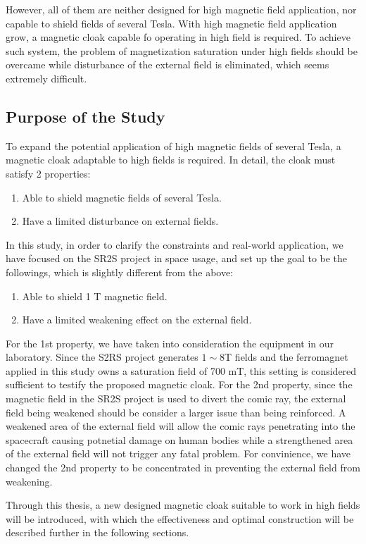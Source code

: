 However, all of them are neither designed for high magnetic field application,
nor capable to shield fields of several Tesla.
With high magnetic field application grow,
a magnetic cloak capable fo operating in high field is required.
To achieve such system, the problem of magnetization saturation under high fields should be overcame
while disturbance of the external field is eliminated,
which seems extremely difficult.


\newpage
\subsection{Purpose of the Study}
To expand the potential application of high magnetic fields of several Tesla,
a magnetic cloak adaptable to high fields is required.
In detail, the cloak must satisfy 2 properties:
\begin{enumerate}
  \item Able to shield magnetic fields of several Tesla.
  \item Have a limited disturbance on external fields.
\end{enumerate}

In this study, in order to clarify the constraints and real-world application,
we have focused on the SR2S project in space usage,
and set up the goal to be the followings, which is slightly different from the above:
\begin{enumerate}
  \item Able to shield 1 T magnetic field.
  \item Have a limited weakening effect on the external field.
\end{enumerate}
For the 1st property, we have taken into consideration the equipment in our laboratory.
Since the S2RS project generates $1\sim 8$T fields and the ferromagnet applied in this study owns a saturation field of 700 mT,
this setting is considered sufficient to testify the proposed magnetic cloak.
For the 2nd property, since the magnetic field in the SR2S project is used to divert the comic ray,
the external field being weakened should be consider a larger issue than being reinforced.
A weakened area of the external field will allow the comic rays penetrating into the spacecraft causing potnetial damage on human bodies while a strengthened area of the external field will not trigger any fatal problem.
For convinience, we have changed the 2nd property to be concentrated in preventing the external field from weakening.

Through this thesis, a new designed magnetic cloak suitable to work in high fields will be introduced,
with which the effectiveness and optimal construction will be described further in the following sections.


